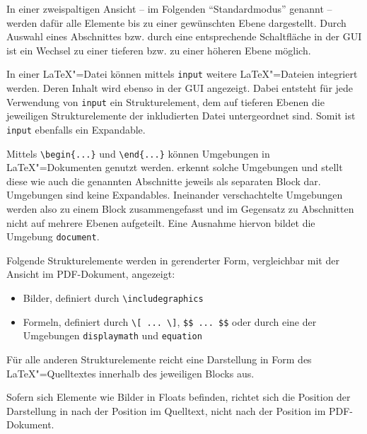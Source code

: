 In einer zweispaltigen Ansicht -- im Folgenden \enquote{Standardmodus} genannt -- werden dafür alle Elemente bis zu
einer gewünschten Ebene dargestellt.
Durch Auswahl eines Abschnittes bzw. durch eine entsprechende Schaltfläche in der GUI ist ein Wechsel zu einer tieferen
bzw. zu einer höheren Ebene möglich.


In einer \LaTeX"=Datei können mittels \verb|input| weitere \LaTeX"=Dateien integriert werden.
Deren Inhalt wird ebenso in der GUI angezeigt.
Dabei entsteht für jede Verwendung von \verb|input| ein Strukturelement, dem auf tieferen Ebenen die jeweiligen
Strukturelemente der inkludierten Datei untergeordnet sind.
Somit ist \verb|input| ebenfalls ein Expandable.

\clearpage


Mittels \verb|\begin{...}| und \verb|\end{...}| können Umgebungen in \LaTeX"=Dokumenten genutzt werden.
\texla{} erkennt solche Umgebungen und stellt diese wie auch die genannten Abschnitte jeweils als separaten Block dar.
Umgebungen sind keine Expandables.
Ineinander verschachtelte Umgebungen werden also zu einem Block zusammengefasst und im Gegensatz zu Abschnitten nicht
auf mehrere Ebenen aufgeteilt.
Eine Ausnahme hiervon bildet die Umgebung \verb|document|.


Folgende Strukturelemente werden in gerenderter Form, vergleichbar mit der Ansicht im PDF-Dokument, angezeigt:

\begin{itemize}
  \item Bilder, definiert durch \verb|\includegraphics|
  \item Formeln, definiert durch \verb|\[ ... \]|, \verb|$$ ... $$| oder durch eine der Umgebungen \verb|displaymath|
  und \verb|equation|
\end{itemize}

Für alle anderen Strukturelemente reicht eine Darstellung in Form des \LaTeX"=Quelltextes innerhalb des jeweiligen
Blocks aus.

Sofern sich Elemente wie Bilder in Floats befinden, richtet sich die Position der Darstellung in \texla{} nach der
Position im Quelltext, nicht nach der Position im PDF-Dokument.

